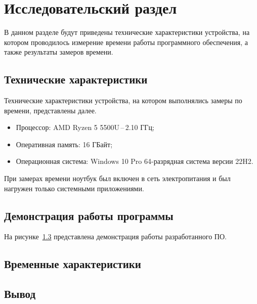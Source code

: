 \chapter{Исследовательский раздел}
В данном разделе будут приведены технические характеристики устройства, на котором проводилось измерение времени работы программного обеспечения, а также результаты замеров времени.

\section{Технические характеристики}
Технические характеристики устройства, на котором выполнялись замеры по времени, представлены далее.
\begin{itemize}
	\item Процессор: AMD Ryzen 5 5500U\,--\,2.10 ГГц;
	\item Оперативная память: 16 ГБайт;
	\item Операционная система: Windows 10 Pro 64-разрядная система версии 22H2.
\end{itemize}

При замерах времени ноутбук был включен в сеть электропитания и был нагружен только системными приложениями.

\section{Демонстрация работы программы}
На рисунке~\ref{} представлена демонстрация работы разработанного ПО.  

\section{Временные характеристики}

\section*{Вывод}